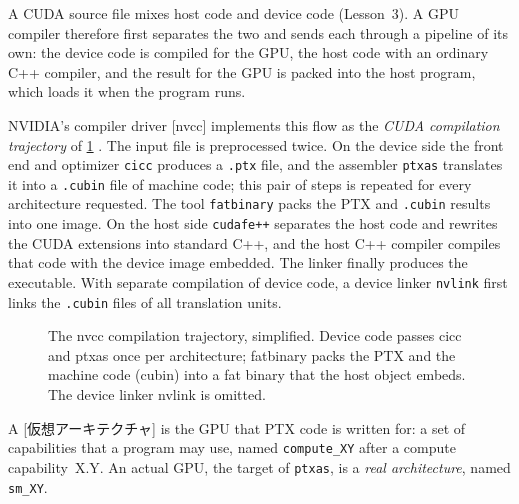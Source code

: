 \documentclass[../main.tex]{subfiles}
\begin{document}
A CUDA source file mixes host code and device code (Lesson~3).  A GPU
compiler therefore first separates the two and sends each through a
pipeline of its own: the device code is compiled for the GPU, the host
code with an ordinary C++ compiler, and the result for the GPU is
packed into the host program, which loads it when the program
runs.

NVIDIA's compiler driver [nvcc] implements this flow as the
\emph{CUDA compilation trajectory} of \cref{fig:l10-cuda-flow}
\cite[§3]{nvidia2026nvcc}.  The input file is preprocessed twice.  On
the device side the front end and optimizer \texttt{cicc} produces a
\texttt{.ptx} file, and the assembler \texttt{ptxas} translates it into
a \texttt{.cubin} file of machine code; this pair of steps is repeated
for every architecture requested.  The tool \texttt{fatbinary} packs
the PTX and \texttt{.cubin} results into one image.  On the host side
\texttt{cudafe++} separates the host code and rewrites the CUDA
extensions into standard C++, and the host C++ compiler compiles that
code with the device image embedded.  The linker finally produces the
executable.  With separate compilation of device code, a
device linker \texttt{nvlink} first links the \texttt{.cubin} files of
all translation units.

\begin{figure}[tb]
  \centering
  
  \caption{The nvcc compilation trajectory, simplified.  Device code
    passes cicc and ptxas once per architecture; fatbinary packs the
    PTX and the machine code (cubin) into a fat binary that the host
    object embeds.  The device linker nvlink is omitted.}
  \label{fig:l10-cuda-flow}
\end{figure}

\begin{definition}
  A [仮想アーキテクチャ] is the GPU that PTX
  code is written for: a set of capabilities that a program may use,
  named \texttt{compute\_XY} after a compute capability~X.Y.  An actual
  GPU, the target of \texttt{ptxas}, is a \emph{real architecture},
  named \texttt{sm\_XY}.
\end{definition}
\end{document}
